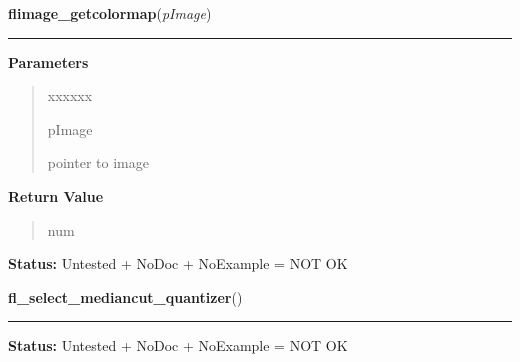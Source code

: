 \hspace{.8\funcindent}\begin{boxedminipage}{\funcwidth}

    \raggedright \textbf{flimage\_getcolormap}(\textit{pImage})

    \vspace{-1.5ex}

    \rule{\textwidth}{0.5\fboxrule}
\setlength{\parskip}{2ex}
\setlength{\parskip}{1ex}
      \textbf{Parameters}
      \vspace{-1ex}

      \begin{quote}
        \begin{Ventry}{xxxxxx}

          \item[pImage]

          pointer to image

        \end{Ventry}

      \end{quote}

      \textbf{Return Value}
    \vspace{-1ex}

      \begin{quote}
      num

      \end{quote}

\textbf{Status:} Untested + NoDoc + NoExample = NOT OK



    \end{boxedminipage}

    \label{xformslib:library:fl_select_mediancut_quantizer}

    \vspace{0.5ex}

\hspace{.8\funcindent}\begin{boxedminipage}{\funcwidth}

    \raggedright \textbf{fl\_select\_mediancut\_quantizer}()

    \vspace{-1.5ex}

    \rule{\textwidth}{0.5\fboxrule}
\setlength{\parskip}{2ex}
\setlength{\parskip}{1ex}
\textbf{Status:} Untested + NoDoc + NoExample = NOT OK



    \end{boxedminipage}


